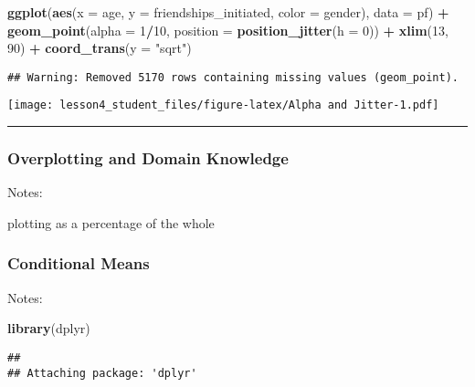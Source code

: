 \documentclass[]{article}
\newenvironment{Shaded}{\begin{snugshade}}{\end{snugshade}}
\newcommand{\KeywordTok}[1]{\textcolor[rgb]{0.13,0.29,0.53}{\textbf{#1}}}
\newcommand{\DataTypeTok}[1]{\textcolor[rgb]{0.13,0.29,0.53}{#1}}
\newcommand{\DecValTok}[1]{\textcolor[rgb]{0.00,0.00,0.81}{#1}}
\newcommand{\StringTok}[1]{\textcolor[rgb]{0.31,0.60,0.02}{#1}}
\newcommand{\OperatorTok}[1]{\textcolor[rgb]{0.81,0.36,0.00}{\textbf{#1}}}
\newcommand{\NormalTok}[1]{#1}
\begin{document}
\begin{Shaded}
\begin{Highlighting}[]
\KeywordTok{ggplot}\NormalTok{(}\KeywordTok{aes}\NormalTok{(}\DataTypeTok{x =}\NormalTok{ age, }\DataTypeTok{y =}\NormalTok{ friendships_initiated, }\DataTypeTok{color =}\NormalTok{ gender), }\DataTypeTok{data =}\NormalTok{ pf) }\OperatorTok{+}
\StringTok{  }\KeywordTok{geom_point}\NormalTok{(}\DataTypeTok{alpha =} \DecValTok{1}\OperatorTok{/}\DecValTok{10}\NormalTok{, }\DataTypeTok{position =} \KeywordTok{position_jitter}\NormalTok{(}\DataTypeTok{h =} \DecValTok{0}\NormalTok{)) }\OperatorTok{+}
\StringTok{  }\KeywordTok{xlim}\NormalTok{(}\DecValTok{13}\NormalTok{, }\DecValTok{90}\NormalTok{) }\OperatorTok{+}
\StringTok{  }\KeywordTok{coord_trans}\NormalTok{(}\DataTypeTok{y =} \StringTok{"sqrt"}\NormalTok{)}
\end{Highlighting}
\end{Shaded}

\begin{verbatim}
## Warning: Removed 5170 rows containing missing values (geom_point).
\end{verbatim}

\texttt{[image: lesson4\_student\_files/figure-latex/Alpha and Jitter-1.pdf]}

\begin{center}\rule{0.5\linewidth}{\linethickness}\end{center}

\subsubsection{Overplotting and Domain
Knowledge}\label{overplotting-and-domain-knowledge}

Notes:

plotting as a percentage of the whole

\subsubsection{Conditional Means}\label{conditional-means}

Notes:

\begin{Shaded}
\begin{Highlighting}[]
\KeywordTok{library}\NormalTok{(dplyr)}
\end{Highlighting}
\end{Shaded}

\begin{verbatim}
## 
## Attaching package: 'dplyr'
\end{verbatim}
\end{document}
